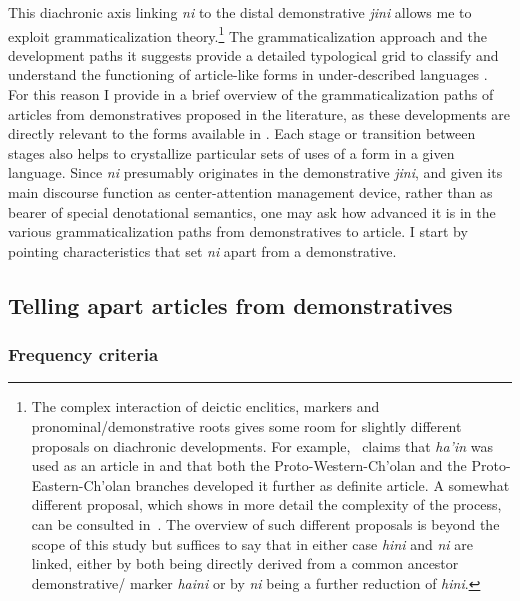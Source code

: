 \documentclass[output=paper
,modfonts
,nonflat]{langsci/langscibook}
\begin{document}
This diachronic axis linking \textit{ni} to the distal demonstrative \textit{jini} allows me to exploit grammaticalization theory.\footnote{The complex interaction of deictic enclitics,  markers and pronominal/demonstrative roots gives some room for slightly different proposals on diachronic developments. For example,~\citet[121]{Mora-Marin2009} claims that \textit{ha'in} was used as an article in  and that both the Proto-Western-Ch'olan and the Proto-Eastern-Ch'olan branches developed it further as definite article. A somewhat different proposal, which shows in more detail the complexity of the process, can be consulted in~\citet[][392--422]{Becquey2014}. The overview of such different proposals is beyond the scope of this study but suffices to say that in either case \textit{hini} and \textit{ni} are linked, either by both being directly derived from a common ancestor demonstrative/ marker \textit{haini} or by \textit{ni} being a further reduction of \textit{hini}.} The grammaticalization approach and the development paths it suggests provide a detailed typological grid to classify and understand the functioning of article-like forms in under-described languages \citep[][832]{Himmelmann2001}. For this reason I provide in  a brief overview of the grammaticalization paths of articles from demonstratives proposed in the literature, as these developments are directly relevant to the forms available in . Each stage or transition between stages also helps to crystallize particular sets of uses of a form in a given language.
Since \textit{ni} presumably originates in the demonstrative \textit{jini}, and given its main discourse function as center-attention management device, rather than as bearer of special denotational semantics, one may ask how advanced it is in the various grammaticalization paths from demonstratives to article. I start by pointing characteristics that set \textit{ni} apart from a demonstrative.

\subsection{Telling apart articles from demonstratives}\label{sec:pico:4.1}

\subsubsection{Frequency criteria}\label{sec:pico:4.1.1}
\end{document}
